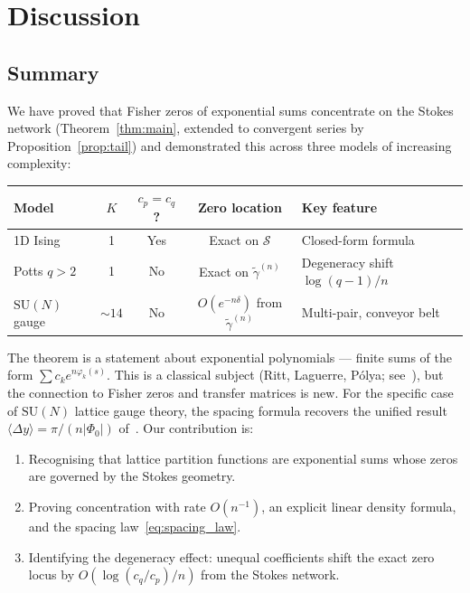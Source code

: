 \documentclass[12pt]{article}
\theoremstyle{definition}
\theoremstyle{remark}
\newcommand{\SU}{\mathrm{SU}}
\newcommand{\avg}[1]{\langle #1 \rangle}
\begin{document}
\section{Discussion}
\label{sec:discussion}

\subsection{Summary}

We have proved that Fisher zeros of exponential sums
concentrate on the Stokes network (Theorem~\ref{thm:main},
extended to convergent series by Proposition~\ref{prop:tail})
and demonstrated this across three models of increasing complexity:

\begin{center}
\begin{tabular}{lcccl}
\toprule
Model & $K$ & $c_p = c_q$? & Zero location & Key feature \\
\midrule
1D Ising & 1 & Yes & Exact on $\mathcal{S}$ & Closed-form formula \\
Potts $q{>}2$ & 1 & No & Exact on $\tilde\gamma^{(n)}$ &
  Degeneracy shift $\log(q{-}1)/n$ \\
$\SU(N)$ gauge & ${\sim}14$ & No & $O(e^{-n\delta})$ from
  $\tilde\gamma^{(n)}$ & Multi-pair, conveyor belt \\
\bottomrule
\end{tabular}
\end{center}

The theorem is a statement about exponential polynomials --- finite
sums of the form $\sum c_k e^{n\varphi_k(s)}$.  This is a classical
subject (Ritt, Laguerre, P\'olya; see~\cite{Olver1997}), but the
connection to Fisher zeros and transfer matrices is new.  For the
specific case of $\SU(N)$ lattice gauge theory, the spacing formula
recovers the unified result $\avg{\Delta y} = \pi/(n|\Phi_0|)$
of~\cite{OlbrykRho}.  Our contribution is:
\begin{enumerate}
\item Recognising that lattice partition functions are exponential sums
  whose zeros are governed by the Stokes geometry.
\item Proving concentration with rate $O(n^{-1})$, an explicit linear
  density formula, and the spacing law~\eqref{eq:spacing_law}.
\item Identifying the degeneracy effect: unequal coefficients shift
  the exact zero locus by $O(\log(c_q/c_p)/n)$ from the Stokes
  network.
\end{enumerate}
\end{document}
